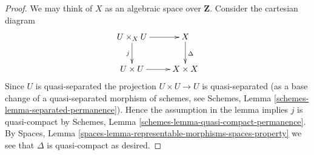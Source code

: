 \documentclass[10pt,a4paper]{amsart}
\theoremstyle{plain}
\theoremstyle{definition}
\theoremstyle{remark}
\numberwithin{equation}{subsection}
\begin{document}
\begin{proof}
We may think of $X$ as an algebraic space over $\mathbf{Z}$.
Consider the cartesian diagram
$$
\xymatrix{
U \times_X U \ar[r] \ar[d]_j & X \ar[d]^\Delta \\
U \times U \ar[r] & X \times X
}
$$
Since $U$ is quasi-separated the projection $U \times U \to U$ is
quasi-separated (as a base change of a quasi-separated morphism
of schemes, see Schemes, Lemma \ref{schemes-lemma-separated-permanence}).
Hence the assumption in the lemma implies $j$ is quasi-compact by
Schemes, Lemma \ref{schemes-lemma-quasi-compact-permanence}.
By Spaces, Lemma \ref{spaces-lemma-representable-morphisms-spaces-property}
we see that $\Delta$ is quasi-compact as desired.
\end{proof}
\end{document}
